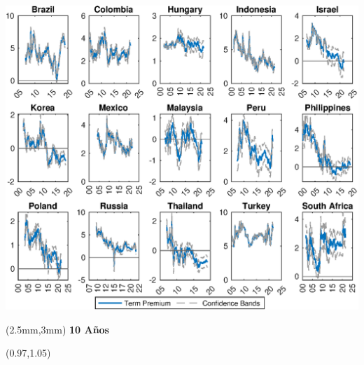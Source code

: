 \documentclass[12pt, aspectratio=169, xcolor=dvipsnames]{beamer}
\begin{document}
\begin{frame}[label=tpCI]
\begin{center}							%
\includegraphics[trim={0cm 0cm 0cm 0cm},clip,height=0.95\textheight,width=\linewidth]{../Figures/Estimation/bsl_tp_CI_10y_V1.eps} \\
\end{center}
\begin{textblock*}{15cm}(2.5mm,3mm)
	\textbf{10 Años}
\end{textblock*}
\begin{textblock*}{5cm}(0.97\textwidth,1.05\textheight)
\hyperlink{YldDcmp10}{}
\end{textblock*}
\end{frame}
\end{document}

